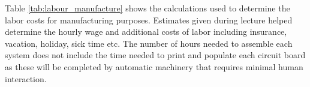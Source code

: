 									
									
									



Table \ref{tab:labour_manufacture} shows the calculations used to determine the labor costs for manufacturing purposes. Estimates given during lecture \cite{Nielsen_Cost_Est} helped determine the hourly wage and additional costs of labor including insurance, vacation, holiday, sick time etc. The number of hours needed to assemble each system does not include the time needed to print and populate each circuit board as these will be completed by automatic machinery that requires minimal human interaction. 

